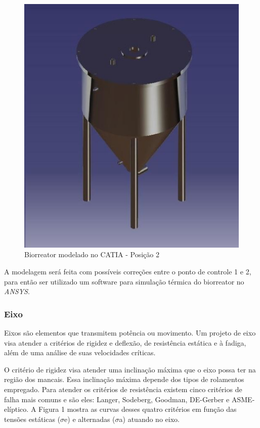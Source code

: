 \begin{figure}[h]
	\centering
	\includegraphics[keepaspectratio=true,scale=0.4]{figuras/catia2.eps}
	\caption{Biorreator modelado no CATIA - Posição 2}
	\label{catia2}
\end{figure}

A modelagem será feita com possíveis correções entre o ponto de controle 1 e 2, para então ser utilizado um software para simulação térmica do biorreator no  \textit{ANSYS}.

\subsubsection{Eixo}

Eixos são elementos que transmitem potência ou movimento. Um projeto de eixo visa atender a critérios de rigidez e deflexão, de resistência estática e à fadiga, além de uma análise de suas velocidades críticas. \cite{shigley2005projeto}

O critério de rigidez visa atender uma inclinação máxima que o eixo possa ter na região dos mancais. Essa inclinação máxima depende dos tipos de rolamentos empregado. Para atender os critérios de resistência existem cinco critérios de falha mais comuns e são eles: Langer, Sodeberg, Goodman, DE-Gerber e ASME-elíptico. A Figura 1 mostra as curvas desses quatro critérios em função das tensões estáticas (\( \sigma \)e) e alternadas (\( \sigma \)a) atuando no eixo. \cite{shigley2005projeto}

